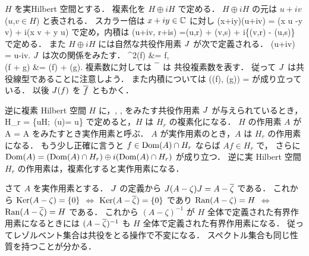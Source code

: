 $H$ を実Hilbert 空間とする．
複素化を $H\oplus i H$ で定める．
$H\oplus i H$ の元は $u+iv$ ($u$,$v\in H$) と表される．
スカラー倍は $x+iy\in{\mathbb C}$ に対し
\bdn %
(x+iy)(u+iv)
= (x u -y v) + i(x v + y u) 
\edn %
で定め，内積は
\bdn %
(u+iv, r+is)
=(u,r) + (v,s) + i\{(v,r) - (u,s)\}
\edn %
で定める．
また $H\oplus i H$ には自然な共役作用素 $J$ が次で定義される．
\bdn %
\J(u+iv)
= u-iv.
\edn %
$J$ は次の関係をみたす．
\bdmn %
\J^2(f)
&= f,
 \\
\J(\al f + \be g)
&= \ol{\al} \J(f) + \ol{\be}\J(g).
\edmn %
複素数に対しては $\overline{\phantom{f}}$ は 共役複素数を表す．
従って $J$ は共役線型であることに注意しよう．
また内積については
\bdn %
(\J(f), \J(g))
= 
\edn %
が成り立っている．
以後 $J(f)$ を $\overline{f}$ ともかく．

逆に複素 Hilbert 空間 $H$ に，, , 
をみたす共役作用素 $J$ が与えられているとき，
\bdm %
H_r
= \{u\in H;\, \J(u)= u\}
\edm %
で定めると，$H$ は $H_r$ の複素化になる．
$H$ の作用素 $A$ が
\bdm %
A\J
= \J A
\edm %
をみたすとき実作用素と呼ぶ．
$A$ が実作用素のとき，$A$ は $H_r$ の作用素になる．
もう少し正確に言うと $f\in \operatorname{Dom}\nolimits(A)\cap H_r$ ならば $Af\in H_r$ で，
さらに $\operatorname{Dom}\nolimits(A) = (\operatorname{Dom}\nolimits(A)\cap H_r)\oplus i(\operatorname{Dom}\nolimits(A)\cap H_r)$ が成り立つ．
逆に実 Hilbert 空間 $H_r$ の作用素は，複素化すると実作用素になる．

さて $A$ を実作用素とする．
$J$ の定義から $J (A-\zeta)J=A-\overline{\zeta}$ である．
これから $\operatorname{Ker}\nolimits(A-\zeta)=\{0\}$ $\Leftrightarrow$ $\operatorname{Ker}\nolimits(A-\overline{\zeta})=\{0\}$
であり $\operatorname{Ran}\nolimits(A-\zeta)=H$ $\Leftrightarrow$ $\operatorname{Ran}\nolimits(A-\overline{\zeta})=H$ である．
これから $(A-\zeta)^{-1}$ が $H$ 全体で定義された有界作用素になるときには
$(A-\overline{\zeta})^{-1}$ も $H$ 全体で定義された有界作用素になる．
従ってレゾルベント集合は共役をとる操作で不変になる．
スペクトル集合も同じ性質を持つことが分かる．

